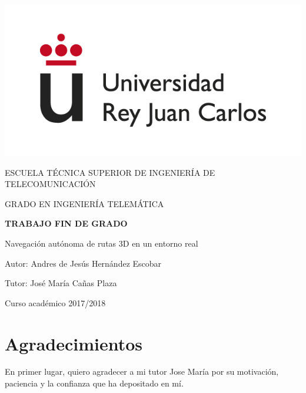 \documentclass[a4paper, 12pt, oneside]{book}
\begin{document}
\begin{titlepage}
	\begin{center}
		\vspace*{1mm}
		\begin{center}
			\includegraphics[width=0.8\linewidth]{imag/logo.jpg}
		\end{center}
		\vspace{6.5mm}
		
		\fontsize{15.5}{14}\selectfont ESCUELA TÉCNICA SUPERIOR DE INGENIERÍA DE TELECOMUNICACIÓN
		\vspace{8mm}
		
		\fontsize{14}{14}\selectfont GRADO EN INGENIERÍA TELEMÁTICA
		
		\vspace{60pt}
		
		\fontsize{15.7}{14}\selectfont \textbf{TRABAJO FIN DE GRADO} 
		
		\vspace{15mm}
		\begin{huge}
			Navegación autónoma de rutas 3D en un entorno real
		\end{huge}
		
		\vspace{15mm}
		
		\begin{large}
			Autor: Andres de Jesús Hernández Escobar
			
			Tutor: José María Cañas Plaza
			
			\vspace{7mm}
		\end{large}
		\begin{normalsize}
			Curso académico 2017/2018		
		\end{normalsize}
	\end{center}
\end{titlepage}

\thispagestyle{empty}
\afterpage{\null\newpage}
\newpage

\chapter*{Agradecimientos}
En primer lugar, quiero agradecer a mi tutor Jose María por su motivación, paciencia y la confianza que ha depositado en mí.
\end{document}
